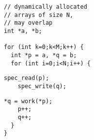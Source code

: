 \begin{lstlisting}[morekeywords={g_qCount},belowskip=0pt, name=ver2a]
// dynamically allocated 
// arrays of size N,
// may overlap
int *a, *b;

for (int k=0;k<M;k++) {
  int *p = a, *q = b;
  for (int i=0;i<N;i++) {
\end{lstlisting}

\begin{lstlisting}[aboveskip=0pt,belowskip=0pt,backgroundcolor=\color{lightgray},
firstnumber=auto, name=ver2a]
    spec_read(p);
    spec_write(q);
\end{lstlisting}

\begin{lstlisting}[aboveskip=0pt,belowskip=0pt, firstnumber=auto, name=ver2a]
    *q = work(*p);
    p++;
    q++;
  }
}
\end{lstlisting}
